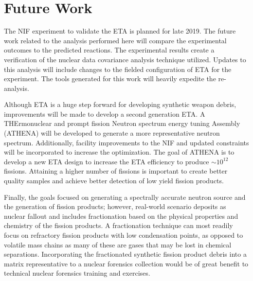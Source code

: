 \section{Future Work}

The NIF experiment to validate the ETA is planned for late 2019. 
The future work related to the analysis performed here will compare the experimental outcomes to the predicted reactions. 
The experimental results create a verification of the nuclear data covariance analysis technique utilized. 
Updates to this analysis will include changes to the fielded configuration of ETA for the experiment. 
The tools generated for this work will heavily expedite the re-analysis. 

Although ETA is a huge step forward for developing synthetic weapon debris, improvements will be made to develop a second generation ETA.
A THErmonuclear and prompt fission Neutron spectrum energy tuning Assembly (ATHENA) will be developed to generate a more representative neutron spectrum. 
Additionally, facility improvements to the NIF and updated constraints will be incorporated to increase the optimization. 
The goal of ATHENA is to develop a new ETA design to increase the ETA efficiency to produce $\sim 10^{12}$ fissions. 
Attaining a higher number of fissions is important to create better quality samples and achieve better detection of low yield fission products. 
 
Finally, the goals focused on generating a spectrally accurate neutron source and the generation of fission products; however, real-world scenario deposits as nuclear fallout and includes fractionation based on the physical properties and chemistry of the fission products. 
A fractionation technique can most readily focus on refractory fission products with low condensation points, as opposed to volatile mass chains as many of these are gases that may be lost in chemical separations.  
Incorporating the fractionated synthetic fission product debris into a matrix representative to a nuclear forensics collection would be of great benefit to technical nuclear forensics training and exercises. 


